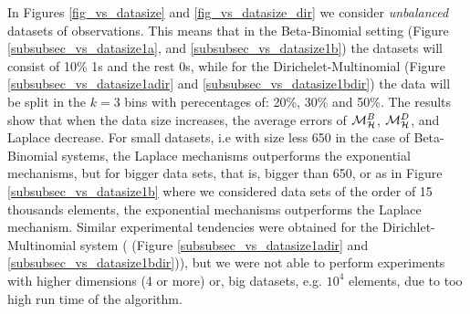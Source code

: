 \documentclass[sigconf, anonymous]{acmart}
\begin{document}
In Figures \ref{fig_vs_datasize} and \ref{fig_vs_datasize_dir} we consider \emph{unbalanced} datasets
of observations. This means that in the Beta-Binomial setting (Figure \ref{subsubsec_vs_datasize1a},
and \ref{subsubsec_vs_datasize1b}) the datasets will consist of 10\% 1s and the rest 0s, while for the
Dirichelet-Multinomial (Figure  \ref{subsubsec_vs_datasize1adir} and \ref{subsubsec_vs_datasize1bdir})
the data will be split in the $k=3$ bins with perecentages of: 20\%, 30\% and 50\%.
The results show that when the data size
increases, the average errors of
$\mathcal{M}^{B}_{\mathcal{H}}$, $\mathcal{M}^{D}_{\mathcal{H}}$, and Laplace decrease. For small datasets,
i.e with size less 650 in the case of Beta-Binomial systems,
the Laplace mechanisms outperforms the exponential mechanisms,
but for bigger data sets, that is, bigger than 650, or as in Figure \ref{subsubsec_vs_datasize1b} where
we considered data sets of the order of 15 thousands elements,
the exponential mechanisms outperforms the Laplace mechanism.
Similar experimental tendencies were obtained for the Dirichlet-Multinomial system ( (Figure  \ref{subsubsec_vs_datasize1adir} and \ref{subsubsec_vs_datasize1bdir})),
but we were not able to perform experiments with higher dimensions (4 or more) or, big datasets, e.g. $10^4$ elements, due to
too high run time of the algorithm.







\end{document}
